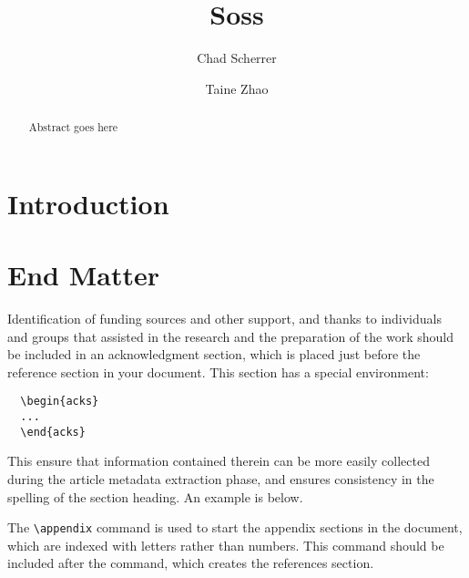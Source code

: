 \documentclass[anonymous=false, %
               format=acmsmall, %
               review=true, %
               screen=true, %
               nonacm=true]{acmart}
\begin{document}
\title{Soss}

\author{Chad Scherrer}

\author{Taine Zhao}

\begin{abstract}
Abstract goes here
\end{abstract}

\maketitle

\section{Introduction}




\section{End Matter}

Identification of funding sources and other support, and thanks to
individuals and groups that assisted in the research and the
preparation of the work should be included in an acknowledgment
section, which is placed just before the reference section in your
document. This section has a special environment:
\begin{verbatim}
  \begin{acks}
  ...
  \end{acks}
\end{verbatim}
This ensure that information contained therein can be more easily collected during the article metadata extraction phase, and ensures consistency in the spelling of the section heading. An example is below.

The \verb|\appendix| command is used to start the appendix sections in the document, which are indexed with letters rather than numbers. This command should be included after  the \verb|| command, which creates the references section. 
\end{document}
